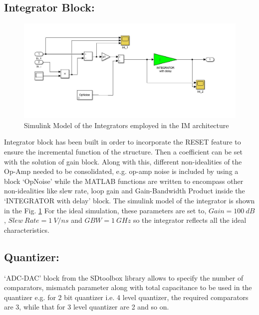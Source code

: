 \subsection{Integrator Block:}
\begin{figure}[h]
\centering
\includegraphics[width=\columnwidth]{Chap04/Figures/sim_first_integrator.JPG}
\caption{Simulink Model of the Integrators employed in the I{\textSigma}{\textDelta}M architecture}
\label{SIM_INT1}
\end{figure}
Integrator block has been built in order to incorporate the RESET feature to ensure the incremental function of the structure. Then a coefficient can be set with the solution of gain block. Along with this, different non-idealities of the Op-Amp needed to be consolidated, e.g. op-amp noise is included by using a block `OpNoise' while the MATLAB functions are written to encompass other non-idealities like slew rate, loop gain and Gain-Bandwidth Product inside the `INTEGRATOR with delay' block. The simulink model of the integrator is shown in the Fig. \ref{SIM_INT1}
For the ideal simulation, these parameters are set to, $Gain = 100\ dB$, $Slew\ Rate = 1\ V/ns$ and $GBW = 1\ GHz$ so the integrator reflects all the ideal characteristics.

\subsection{Quantizer:}
`ADC-DAC' block from the SDtoolbox library allows to specify the number of comparators, mismatch parameter along with total capacitance to be used in the quantizer e.g. for 2 bit quantizer i.e. 4 level quantizer, the required comparators are 3, while that for 3 level quantizer are 2 and so on.

